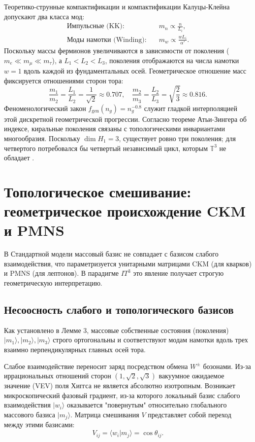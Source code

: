 \documentclass[12pt,a4paper]{article}
\begin{document}
Теоретико-струнные компактификации и компактификации Калуцы-Клейна допускают два класса мод:
\begin{align}
    \text{Импульсные (KK):} \quad & m_n \propto \frac{n}{L_i}, \\
    \text{Моды намотки (Winding):} \quad & m_w \propto \frac{w L_i}{\alpha'}.
\end{align}
Поскольку массы фермионов увеличиваются в зависимости от поколения ($m_e \ll m_\mu \ll m_\tau$), а $L_1 < L_2 < L_3$, поколения отображаются на числа намотки $w=1$ вдоль каждой из фундаментальных осей. Геометрическое отношение масс фиксируется отношениями сторон тора:
\begin{equation}
    \frac{m_1}{m_2} = \frac{L_1}{L_2} = \frac{1}{\sqrt{2}} \approx 0.707, \quad \frac{m_2}{m_3} = \frac{L_2}{L_3} = \sqrt{\frac{2}{3}} \approx 0.816.
\end{equation}
Феноменологический закон $f_{\text{gen}}(n_g) = n_g^{-0.8}$ служит гладкой интерполяцией этой дискретной геометрической прогрессии. Согласно теореме Атьи-Зингера об индексе, киральные поколения связаны с топологическими инвариантами многообразия. Поскольку $\dim H_1 = 3$, существует ровно три поколения; для четвертого потребовался бы четвертый независимый цикл, которым $\mathbb{T}^3$ не обладает \cite{Atiyah1963}.

\section{Топологическое смешивание: геометрическое происхождение CKM и PMNS}
В Стандартной модели массовый базис не совпадает с базисом слабого взаимодействия, что параметризуется унитарными матрицами CKM (для кварков) и PMNS (для лептонов). В парадигме $IT^3$ это явление получает строгую геометрическую интерпретацию.

\subsection{Несоосность слабого и топологического базисов}
Как установлено в Лемме 3, массовые собственные состояния (поколения) $|m_1\rangle, |m_2\rangle, |m_3\rangle$ строго ортогональны и соответствуют модам намотки вдоль трех взаимно перпендикулярных главных осей тора.

Слабое взаимодействие переносит заряд посредством обмена $W^\pm$ бозонами. Из-за иррациональных отношений сторон $(1, \sqrt{2}, \sqrt{3})$ вакуумное ожидаемое значение (VEV) поля Хиггса не является абсолютно изотропным. Возникает микроскопический фазовый градиент, из-за которого локальный базис слабого взаимодействия $|w_i\rangle$ оказывается "повернутым" относительно глобального массового базиса $|m_j\rangle$. Матрица смешивания $V$ представляет собой переход между этими базисами:
\begin{equation}
    V_{ij} = \langle w_i | m_j \rangle = \cos \theta_{ij}.
\end{equation}
\end{document}
